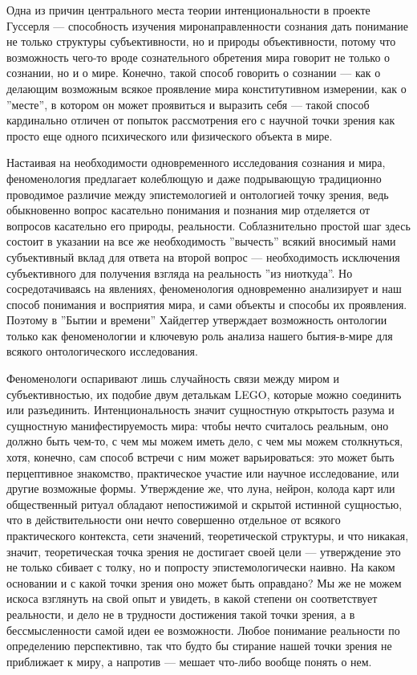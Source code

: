 \documentclass[11pt]{book}
\begin{document}
Одна из причин центрального места теории интенциональности в проекте Гуссерля --- способность изучения миронаправленности сознания дать понимание не только структуры субъективности, но и природы объективности, потому что возможность чего-то вроде сознательного обретения мира говорит не только о сознании, но и о мире. Конечно, такой способ говорить о сознании --- как о делающим возможным всякое проявление мира конститутивном измерении, как о ''месте'', в котором он может проявиться и выразить себя --- такой способ кардинально отличен от попыток рассмотрения его с научной точки зрения как просто еще одного психического или физического объекта в мире.

Настаивая на необходимости одновременного исследования сознания и мира, феноменология предлагает колеблющую и даже подрывающую традиционно проводимое различие между эпистемологией и онтологией точку зрения, ведь обыкновенно вопрос касательно понимания и познания мир отделяется от вопросов касательно его природы, реальности. Соблазнительно простой шаг здесь состоит в указании на все же необходимость ''вычесть'' всякий вносимый нами субъективный вклад для ответа на второй вопрос --- необходимость исключения субъективного для получения взгляда на реальность ''из ниоткуда''. Но сосредотачиваясь на явлениях, феноменология одновременно анализирует и наш способ понимания и восприятия мира, и сами объекты и способы их проявления. Поэтому в ''Бытии и времени'' Хайдеггер утверждает возможность онтологии только как феноменологии и ключевую роль анализа нашего бытия-в-мире для всякого онтологического исследования.

Феноменологи оспаривают лишь случайность связи между миром и субъективностью, их подобие двум деталькам LEGO, которые можно соединить или разъединить. Интенциональность значит сущностную открытость разума и сущностную манифестируемость мира: чтобы нечто считалось реальным, оно должно быть чем-то, с чем мы можем иметь дело, с чем мы можем столкнуться, хотя, конечно, сам способ встречи с ним может варьироваться: это может быть перцептивное знакомство, практическое участие или научное исследование, или другие возможные формы. Утверждение же, что луна, нейрон, колода карт или общественный ритуал обладают непостижимой и скрытой истинной сущностью, что в действительности они нечто совершенно отдельное от всякого практического контекста, сети значений, теоретической структуры, и что никакая, значит, теоретическая точка зрения не достигает своей цели --- утверждение это не только сбивает с толку, но и попросту эпистемологически наивно. На каком основании и с какой точки зрения оно может быть оправдано? Мы же не можем искоса взглянуть  на свой опыт и увидеть, в какой степени он соответствует реальности, и дело не в трудности достижения такой точки зрения, а в бессмысленности самой идеи ее возможности. Любое понимание реальности по определению перспективно, так что будто бы стирание нашей точки зрения не приближает к миру, а напротив --- мешает что-либо вообще понять о нем.
\end{document}
